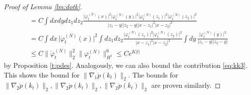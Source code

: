 \documentclass[11pt,a4paper]{article}
\newcommand{\di}{{d}}		%
\newcommand{\ph}{\varphi_t^{(N)}}	%
\newcommand{\phdot}{\dot{\varphi}_t^{(N)}}	%
\begin{document}
\begin{proof}[Proof of Lemma \ref{lm:dotk}]
\begin{align*}
& = C \int \di x \di y \di z_1 \di z_2 \frac{\lvert\phdot(x)\rvert^2 \lvert \ph(y)\rvert^2 \lvert \ph(z_1)\rvert^2 \lvert \ph(z_2)\rvert^2}{\lvert z_1-y\rvert \lvert z_2 -y\rvert \lvert x-z_1\rvert^2 \lvert x-z_2\rvert^2} \\
& = C \int \di x\, \lvert\phdot(x)\rvert^2 \int \di z_1 \di z_2 \frac{\lvert \ph(z_1)\rvert^2 \lvert \ph(z_2)\rvert^2}{\lvert x-z_1\rvert^2 \lvert x-z_2\rvert^2} \int \di y \, \frac{\lvert \ph(y)\rvert^2}{\lvert z_1-y\rvert \lvert z_2 - y\rvert} \\ &\leq C \| \phdot \|_2^2 \| \ph \|_{H^1}^6 \leq C e^{K|t|}
 \end{align*}
 by Proposition \ref{t:pdes}. Analogously, we can also bound the contribution \eqref{eq:kk3}. 
This shows the bound for $\| \nabla_1 \dot p (k_t) \|_2$. The bounds for $\| \nabla_2 \dot p (k_t) \|_2,\| \nabla_2 \dot p (k_t) \|_2, \| \nabla_2 \dot p (k_t) \|_2$ are proven similarly.


\end{proof}
\end{document}
